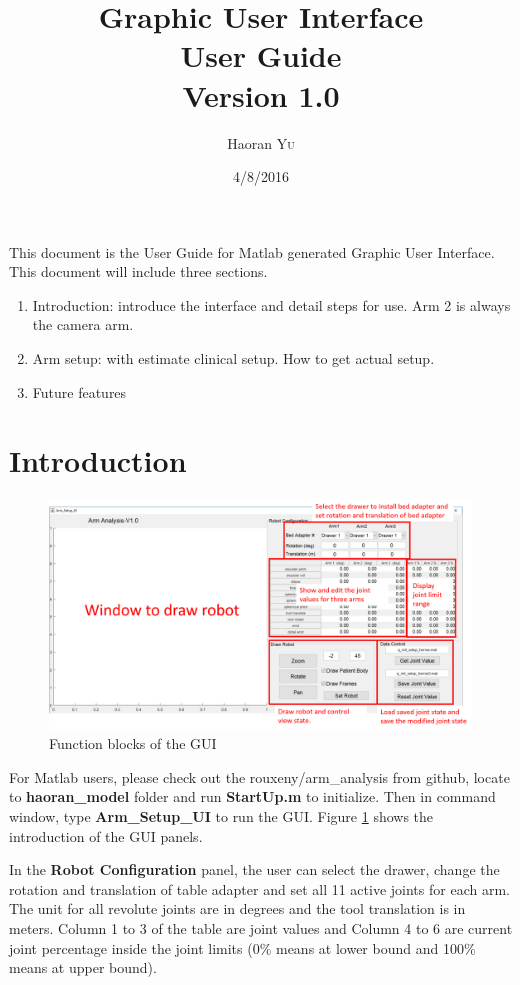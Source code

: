 \documentclass{article}
\title{Graphic User Interface \\ User Guide \\ Version 1.0} %
\author{Haoran \textsc{Yu}} %
\date{4/8/2016} %
\begin{document}
\maketitle

This document is the User Guide for Matlab generated Graphic User Interface. This document will include three sections.
\begin{enumerate}
\item Introduction: introduce the interface and detail steps for use. Arm 2 is always the camera arm.
\item Arm setup: with estimate clinical setup. How to get actual setup.
\item Future features
\end{enumerate}

\section{Introduction}
\begin{figure}[htbp]
  \centering
    \includegraphics[width=1\columnwidth]{GUI_function}
	\caption{Function blocks of the GUI}\label{fig:GUI_function}
\end{figure}
For Matlab users, please check out the rouxeny/arm\_analysis from github, locate to \textbf{haoran\_model} folder and run \textbf{StartUp.m} to initialize. Then in command window, type \textbf{Arm\_Setup\_UI} to run the GUI. Figure \ref{fig:GUI_function} shows the introduction of the GUI panels. 

In the \textbf{Robot Configuration} panel, the user can select the drawer, change the rotation and translation of table adapter and set all 11 active joints for each arm. The unit for all revolute joints are in degrees and the tool translation is in meters. Column 1 to 3 of the table are joint values and Column 4 to 6 are current joint percentage inside the joint limits (0\% means at lower bound and 100\% means at upper bound). 
\end{document}
